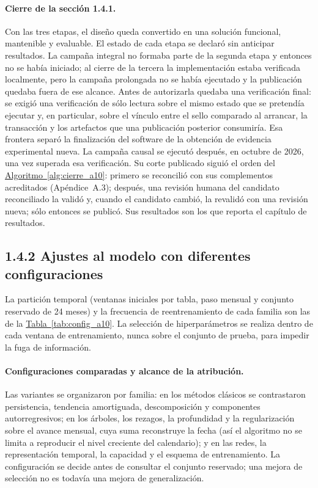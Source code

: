 \documentclass[12pt,letterpaper]{report}
\begin{document}
\paragraph{Cierre de la sección 1.4.1.} Con las tres etapas, el diseño queda convertido en una
solución funcional, mantenible y evaluable. El estado de cada etapa se declaró sin anticipar
resultados. La campaña integral no formaba parte de la segunda etapa y entonces no se había
iniciado; al cierre de la tercera la implementación estaba verificada localmente, pero la
campaña prolongada no se había ejecutado y la publicación quedaba fuera de ese alcance. Antes de
autorizarla quedaba una verificación final: se exigió una verificación de sólo
lectura sobre el mismo estado que se pretendía ejecutar y, en particular, sobre el vínculo entre
el sello comparado al arrancar, la transacción y los artefactos que una publicación posterior
consumiría. Esa frontera separó la finalización del software de la obtención de evidencia
experimental nueva. La campaña causal se ejecutó después, en octubre de 2026, una vez superada esa
verificación. Su corte publicado siguió el orden del \hyperref[alg:cierre_a10]{Algoritmo~\ref*{alg:cierre_a10}}: primero se
reconcilió con sus complementos acreditados (Apéndice~A.3); después, una revisión humana del
candidato reconciliado la validó y, cuando el candidato cambió, la revalidó con una revisión
nueva; sólo entonces se publicó. Sus resultados son los que reporta el capítulo de resultados.


\subsection{1.4.2 Ajustes al modelo con diferentes configuraciones}

La partición temporal (ventanas iniciales por tabla, paso mensual y conjunto reservado de 24
meses) y la frecuencia de reentrenamiento de cada familia son las de la
\hyperref[tab:config_a10]{Tabla~\ref*{tab:config_a10}}. La selección de hiperparámetros se realiza dentro de cada ventana de
entrenamiento, nunca sobre el conjunto de prueba, para impedir la fuga de información.

\paragraph{Configuraciones comparadas y alcance de la atribución.} Las variantes se organizaron
por familia: en los métodos clásicos se contrastaron persistencia, tendencia amortiguada,
descomposición y componentes autorregresivos; en los árboles, los rezagos, la profundidad y la
regularización sobre el avance mensual, cuya suma reconstruye la fecha (así el algoritmo no se
limita a reproducir el nivel creciente del calendario); y en las redes, la representación
temporal, la capacidad y el esquema de entrenamiento. La configuración se decide antes de
consultar el conjunto reservado; una mejora de selección no es todavía una mejora de
generalización.
\end{document}
